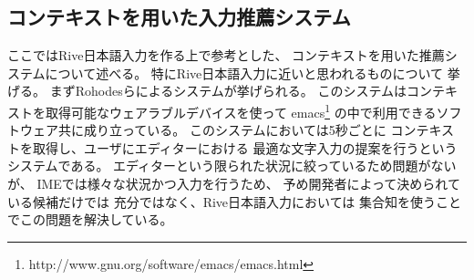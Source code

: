 \subsection{コンテキストを用いた入力推薦システム}
ここではRive日本語入力を作る上で参考とした、
コンテキストを用いた推薦システムについて述べる。
特にRive日本語入力に近いと思われるものについて
挙げる。
まずRohodesらによるシステムが挙げられる。\cite{ROHODESB.J.:1997}
このシステムはコンテキストを取得可能なウェアラブルデバイスを使って
emacs\footnote{http://www.gnu.org/software/emacs/emacs.html}
の中で利用できるソフトウェア共に成り立っている。
このシステムにおいては5秒ごとに
コンテキストを取得し、ユーザにエディターにおける
最適な文字入力の提案を行うというシステムである。
エディターという限られた状況に絞っているため問題がないが、
IMEでは様々な状況かつ入力を行うため、
予め開発者によって決められている候補だけでは
充分ではなく、Rive日本語入力においては
集合知を使うことでこの問題を解決している。

